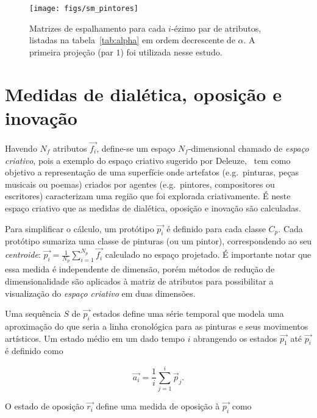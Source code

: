 \begin{figure}[h!]
\begin{center}
      \caption{Matrizes de espalhamento para cada $i$-ézimo par de atributos, listadas na
        tabela~\ref{tab:alpha} em ordem decrescente de $\alpha$. A primeira
        projeção (par $1$) foi utilizada nesse estudo.}
        \label{fig:scatters}
        \end{center}
{    \centering
        \texttt{[image: figs/sm\_pintores]}}
        \fonteminha
\end{figure}

\clearpage
\section{Medidas de dialética, oposição e inovação}
\label{sec:medidas}

Havendo $N_f$ atributos $\vec{f_i}$, define-se um espaço
$N_f$-dimensional chamado de \textit{espaço criativo}, pois a exemplo
do espaço criativo sugerido por Deleuze,~\cite{deleuze} tem como
objetivo a representação de uma superfície onde artefatos
(e.g.\ pinturas, peças musicais ou poemas) criados por agentes
(e.g.\ pintores, compositores ou escritores) caracterizam uma região que
foi explorada criativamente. É neste espaço criativo que as medidas de
dialética, oposição e inovação são calculadas.~\cite{vieira}

Para simplificar o cálculo, um protótipo $\vec{p_i}$ é definido para cada classe
$C_p$. Cada protótipo sumariza uma classe de pinturas (ou um pintor),
correspondendo ao seu \textit{centroide}: $\vec{p_i} = \frac{1}{N_p}
\sum_{i=1}^{N_p} \vec{f_i}$ calculado no espaço projetado. É importante notar
que essa medida é independente de dimensão, porém métodos de redução de
dimensionalidade são aplicados à matriz de atributos para possibilitar a
visualização do \textit{espaço criativo} em duas dimensões.

Uma sequência $S$ de $\vec{p_i}$ estados define uma série temporal que
modela uma aproximação do que seria a linha cronológica para as
pinturas e seus movimentos artísticos. Um estado médio em um dado
tempo $i$ abrangendo os estados $\vec{p_1}$ até $\vec{p_i}$ é definido
como

\begin{equation}
\vec{a_i} = \frac{1}{i}\sum_{j=1}^i\vec{p}_j.
\end{equation}

O estado de oposição $\vec{r_i}$ define uma medida de oposição à $\vec{p_i}$ como

